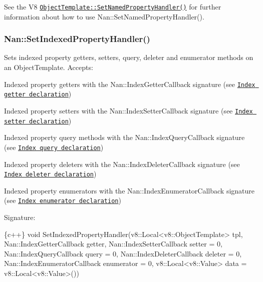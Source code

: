 See the V8 \href{https://v8docs.nodesource.com/io.js-3.0/db/d5f/classv8_1_1_object_template.html#a34d1cc45b642cd131706663801aadd76}{\tt {\ttfamily Object\+Template\+::\+Set\+Named\+Property\+Handler()}} for further information about how to use {\ttfamily Nan\+::\+Set\+Named\+Property\+Handler()}.

\label{_api_nan_set_indexed_property_handler}%
 \subsubsection*{Nan\+::\+Set\+Indexed\+Property\+Handler()}

Sets indexed property getters, setters, query, deleter and enumerator methods on an {\ttfamily Object\+Template}. Accepts\+:


\begin{DoxyItemize}
\item Indexed property getters with the {\ttfamily Nan\+::\+Index\+Getter\+Callback} signature (see \href{#api_nan_index_getter}{\tt Index getter declaration})
\item Indexed property setters with the {\ttfamily Nan\+::\+Index\+Setter\+Callback} signature (see \href{#api_nan_index_setter}{\tt Index setter declaration})
\item Indexed property query methods with the {\ttfamily Nan\+::\+Index\+Query\+Callback} signature (see \href{#api_nan_index_query}{\tt Index query declaration})
\item Indexed property deleters with the {\ttfamily Nan\+::\+Index\+Deleter\+Callback} signature (see \href{#api_nan_index_deleter}{\tt Index deleter declaration})
\item Indexed property enumerators with the {\ttfamily Nan\+::\+Index\+Enumerator\+Callback} signature (see \href{#api_nan_index_enumerator}{\tt Index enumerator declaration})
\end{DoxyItemize}

Signature\+:


\begin{DoxyCode}
\{c++\}
void SetIndexedPropertyHandler(v8::Local<v8::ObjectTemplate> tpl,
                               Nan::IndexGetterCallback getter,
                               Nan::IndexSetterCallback setter = 0,
                               Nan::IndexQueryCallback query = 0,
                               Nan::IndexDeleterCallback deleter = 0,
                               Nan::IndexEnumeratorCallback enumerator = 0,
                               v8::Local<v8::Value> data = v8::Local<v8::Value>())
\end{DoxyCode}


